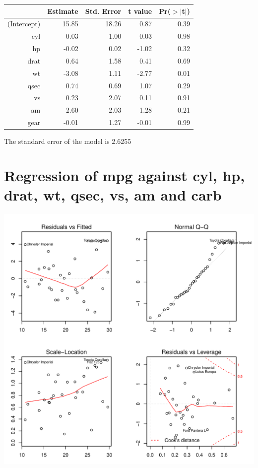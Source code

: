 \documentclass{article}\usepackage[]{graphicx}\usepackage[]{color}
\makeatletter
\def\maxwidth{ %
  \ifdim\Gin@nat@width>\linewidth
    \linewidth
  \else
    \Gin@nat@width
  \fi
}
\newenvironment{knitrout}{}{} %
\makeatother
\begin{document}
\begin{table}[ht]
\centering
\begin{tabular}{rrrrr}
  \hline
 & Estimate & Std. Error & t value & Pr($>$$|$t$|$) \\ 
  \hline
(Intercept) & 15.85 & 18.26 & 0.87 & 0.39 \\ 
  cyl & 0.03 & 1.00 & 0.03 & 0.98 \\ 
  hp & -0.02 & 0.02 & -1.02 & 0.32 \\ 
  drat & 0.64 & 1.58 & 0.41 & 0.69 \\ 
  wt & -3.08 & 1.11 & -2.77 & 0.01 \\ 
  qsec & 0.74 & 0.69 & 1.07 & 0.29 \\ 
  vs & 0.23 & 2.07 & 0.11 & 0.91 \\ 
  am & 2.60 & 2.03 & 1.28 & 0.21 \\ 
  gear & -0.01 & 1.27 & -0.01 & 0.99 \\ 
   \hline
\end{tabular}
\end{table}




The standard error of the model is 2.6255

\newpage

\section{Regression of mpg against cyl, hp, drat, wt, qsec, vs, am and carb }
\begin{knitrout}
\color{fgcolor}

{\centering \includegraphics[width=\maxwidth]{figure/lm-cyl-hp-drat-wt-qsec-vs-am-carb} 

}



\end{knitrout}
\end{document}
